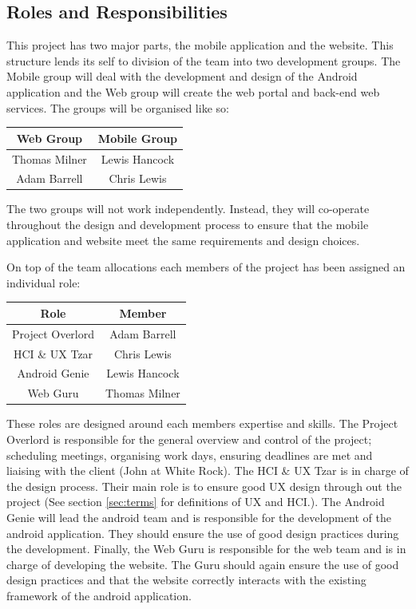 \documentclass[11pt,a4paper]{article}
\begin{document}
\subsection{Roles and Responsibilities}
This project has two major parts, the mobile application and the website. This structure lends its self to division of the team into two development groups. The Mobile group will deal with the development and design of the Android application and the Web group will create the web portal and back-end web services. The groups will be organised like so:  
\begin{table}[h]
\begin{center}
\begin{tabular}{|c|c|}
\hline
\textbf{Web Group} & \textbf{Mobile Group} \\
\hline
Thomas Milner & Lewis Hancock \\
Adam Barrell & Chris Lewis \\ \hline
\end{tabular}
\end{center}
\end{table}

The two groups will not work independently. Instead, they will co-operate throughout the design and development process to ensure that the mobile application and website meet the same requirements and design choices. 

On top of the team allocations each members of the project has been assigned an individual role:

\begin{table}[H]
\begin{center}
\begin{tabular}{|c|c|}
\hline
\textbf{Role} & \textbf{Member} \\
\hline
Project Overlord & Adam Barrell  \\\hline
HCI \& UX Tzar & Chris Lewis \\ \hline
Android Genie & Lewis Hancock \\\hline
Web Guru & Thomas Milner \\\hline
\end{tabular}
\end{center}
\end{table}

These roles are designed around each members expertise and skills. The Project Overlord is responsible for the general overview and control of the project; scheduling meetings, organising work days, ensuring deadlines are met and liaising with the client (John at White Rock). The HCI \& UX Tzar is in charge of the design process. Their main role is to ensure good UX design through out the project (See section \ref{sec:terms} for definitions of UX and HCI.). The Android Genie will lead the android team and is responsible for the development of the android application. They should ensure the use of good design practices during the development. Finally, the Web Guru is responsible for the web team and is in charge of developing the website. The Guru should again ensure the use of good design practices and that the website correctly interacts with the existing framework of the android application. 
\end{document}
